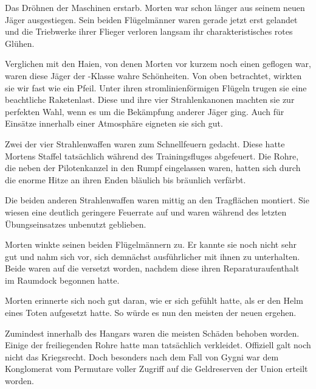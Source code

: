 Das Dröhnen der Maschinen erstarb. Morten war schon länger aus seinem neuen Jäger ausgestiegen. Sein beiden Flügelmänner waren gerade jetzt erst gelandet und die Triebwerke ihrer Flieger verloren langsam ihr charakteristisches rotes Glühen.

\par

Verglichen mit den Haien, von denen Morten vor kurzem noch einen geflogen war, waren diese Jäger der -Klasse wahre Schönheiten. Von oben betrachtet, wirkten sie wir fast wie ein Pfeil. Unter ihren stromlinienförmigen Flügeln trugen sie eine beachtliche Raketenlast. Diese und ihre vier Strahlenkanonen machten sie zur perfekten Wahl, wenn es um die Bekämpfung anderer Jäger ging. Auch für Einsätze innerhalb einer Atmosphäre eigneten sie sich gut.

\par

Zwei der vier Strahlenwaffen waren zum Schnellfeuern gedacht. Diese hatte Mortens Staffel tatsächlich während des Trainingsfluges abgefeuert. Die Rohre, die neben der Pilotenkanzel in den Rumpf eingelassen waren, hatten sich durch die enorme Hitze an ihren Enden bläulich bis bräunlich verfärbt.

\par

Die beiden anderen Strahlenwaffen waren mittig an den Tragflächen montiert. Sie wiesen eine deutlich geringere Feuerrate auf und waren während des letzten Übungseinsatzes unbenutzt geblieben.

\par

Morten winkte seinen beiden Flügelmännern zu. Er kannte sie noch nicht sehr gut und nahm sich vor, sich demnächst ausführlicher mit ihnen zu unterhalten. Beide waren auf die  versetzt worden, nachdem diese ihren Reparaturaufenthalt im Raumdock begonnen hatte.

\par

Morten erinnerte sich noch gut daran, wie er sich gefühlt hatte, als er den Helm eines Toten aufgesetzt hatte. So würde es nun den meisten der neuen ergehen.

\par

Zumindest innerhalb des Hangars waren die meisten Schäden behoben worden. Einige der freiliegenden Rohre hatte man tatsächlich verkleidet. Offiziell galt noch nicht das Kriegsrecht. Doch besonders nach dem Fall von Gygni war dem Konglomerat vom Permutare voller Zugriff auf die Geldreserven der Union erteilt worden.

